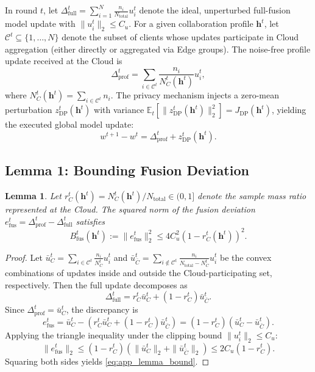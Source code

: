 \documentclass[5p,times]{elsarticle}
\theoremstyle{plain}
\newtheorem{lemma}[theorem]{Lemma}
\theoremstyle{definition}
\theoremstyle{remark}
\begin{document}
In round $t$, let $\Delta_{\mathrm{full}}^t = \sum_{i=1}^N \frac{n_i}{N_{\mathrm{total}}} u_i^t$ denote the ideal, unperturbed full-fusion model update with $\|u_i^t\|_2 \le C_u$. For a given collaboration profile $\mathbf h^t$, let $\mathcal C^t \subseteq \{1,\dots,N\}$ denote the subset of clients whose updates participate in Cloud aggregation (either directly or aggregated via Edge groups). The noise-free profile update received at the Cloud is
\begin{equation}
\Delta_{\mathrm{prof}}^t = \sum_{i \in \mathcal C^t} \frac{n_i}{N_C^t(\mathbf h^t)} u_i^t,
\end{equation}
where $N_C^t(\mathbf h^t) = \sum_{i \in \mathcal C^t} n_i$.
The privacy mechanism injects a zero-mean perturbation $z_{\mathrm{DP}}^t(\mathbf h^t)$ with variance $\mathbb E_t[\|z_{\mathrm{DP}}^t(\mathbf h^t)\|_2^2] = J_{\mathrm{DP}}(\mathbf h^t)$, yielding the executed global model update:
\begin{equation}
w^{t+1} - w^t = \Delta_{\mathrm{prof}}^t + z_{\mathrm{DP}}^t(\mathbf h^t).
\end{equation}

\subsection{Lemma 1: Bounding Fusion Deviation}
\begin{lemma}
Let $r_C^t(\mathbf h^t) = N_C^t(\mathbf h^t) / N_{\mathrm{total}} \in (0, 1]$ denote the sample mass ratio represented at the Cloud. The squared norm of the fusion deviation $e_{\mathrm{fus}}^t = \Delta_{\mathrm{prof}}^t - \Delta_{\mathrm{full}}^t$ satisfies
\begin{equation}
B_{\mathrm{fus}}^t(\mathbf h^t) := \|e_{\mathrm{fus}}^t\|_2^2 \le 4C_u^2\left(1 - r_C^t(\mathbf h^t)\right)^2.
\label{eq:app_lemma_bound}
\end{equation}
\end{lemma}

\begin{proof}
Let $\bar u_C^t = \sum_{i \in \mathcal C^t} \frac{n_i}{N_C^t} u_i^t$ and $\bar u_{\bar C}^t = \sum_{i \notin \mathcal C^t} \frac{n_i}{N_{\mathrm{total}} - N_C^t} u_i^t$ be the convex combinations of updates inside and outside the Cloud-participating set, respectively. Then the full update decomposes as
\begin{equation}
\Delta_{\mathrm{full}}^t = r_C^t \bar u_C^t + (1 - r_C^t)\bar u_{\bar C}^t.
\end{equation}
Since $\Delta_{\mathrm{prof}}^t = \bar u_C^t$, the discrepancy is
\begin{equation}
e_{\mathrm{fus}}^t = \bar u_C^t - \left(r_C^t \bar u_C^t + (1 - r_C^t)\bar u_{\bar C}^t\right) = (1 - r_C^t)(\bar u_C^t - \bar u_{\bar C}^t).
\end{equation}
Applying the triangle inequality under the clipping bound $\|u_i^t\|_2 \le C_u$:
\begin{equation}
\|e_{\mathrm{fus}}^t\|_2 \le (1 - r_C^t)\left(\|\bar u_C^t\|_2 + \|\bar u_{\bar C}^t\|_2\right) \le 2C_u(1 - r_C^t).
\end{equation}
Squaring both sides yields \eqref{eq:app_lemma_bound}.
\end{proof}
\end{document}
